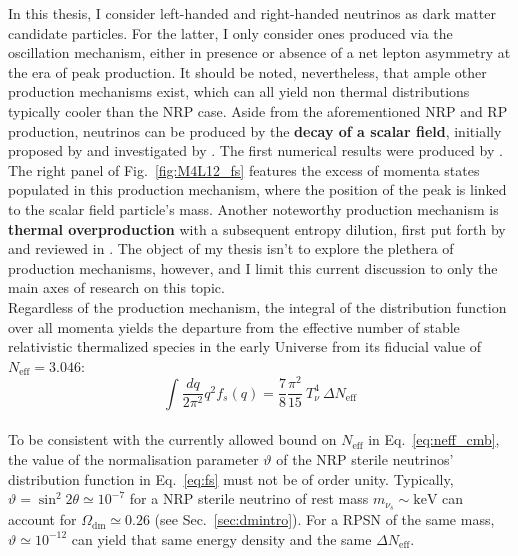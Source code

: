 In this thesis, I consider left-handed and right-handed neutrinos as dark matter candidate particles. For the latter, I only consider ones produced via the oscillation mechanism, either in presence or absence of a net lepton asymmetry at the era of peak production. It should be noted, nevertheless, that ample other production mechanisms exist, which can all yield non thermal distributions typically cooler than the NRP case. Aside from the aforementioned NRP and RP production, neutrinos can be produced by the \textbf{decay of a scalar field}, initially proposed by \cite{Scalar_Decay3} and investigated by \cite{Scalar_Decay1, Scalar_Decay2, Scalar_Decay4}. The first numerical results were produced by \cite{Scalar_Decay_Merle}. The right panel of Fig.~\ref{fig:M4L12_fs} features the excess of momenta states populated in this production mechanism, where the position of the peak is linked to the scalar field particle's mass. Another noteworthy production mechanism is \textbf{thermal overproduction} with a subsequent entropy dilution, first put forth by \cite{thermal_overproduction} and reviewed in \cite{KingMerle}. The object of my thesis isn't to explore the plethera of production mechanisms, however, and I limit this current discussion to only the main axes of research on this topic. \\

Regardless of the production mechanism, the integral of the distribution function over all momenta yields the departure from the effective number of stable relativistic thermalized species in the early Universe from its fiducial value of $N_{\mathrm{eff}} = 3.046$: \\
\begin{equation}
\int \frac{dq}{2 \pi^2} q^2 f_s (q) = \frac{7}{8} \frac{\pi^2}{15}~T^4_\nu~\Delta N_{\mathrm{eff}}
\end{equation} \\To be consistent with the currently allowed bound on $N_{\mathrm{eff}}$ in Eq.~\ref{eq:neff_cmb}, the value of the normalisation parameter $\vartheta$ of the NRP sterile neutrinos' distribution function in Eq.~\ref{eq:fs} must not be of order unity. Typically, $\vartheta = \sin^2 2 \theta \simeq 10^{-7}$ for a NRP sterile neutrino of rest mass $m_{\nu_s} \sim \mathrm{keV}$ can account for $\Omega_{\mathrm{dm}} \simeq 0.26$ (see Sec.~\ref{sec:dmintro}). For a RPSN of the same mass, $\vartheta \simeq 10^{-12}$ can yield that same energy density and the same $\Delta N_{\mathrm{eff}}$. 








